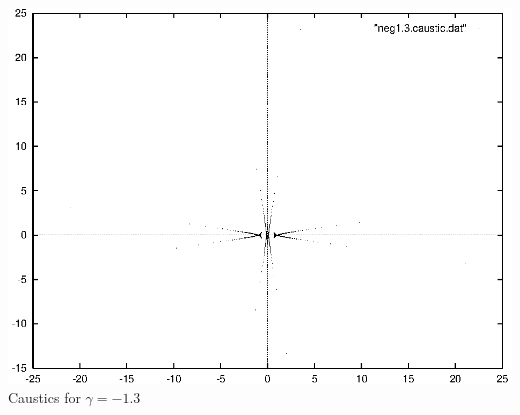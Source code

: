 \documentclass[a4paper]{IEEEtran}
\begin{document}
    \begin{center}
        \includegraphics[width=\columnwidth]{images/neg1-3-caustic.eps} 
        \\[1mm]
        Caustics for $\gamma = -1.3$
    \end{center}
\end{document}
